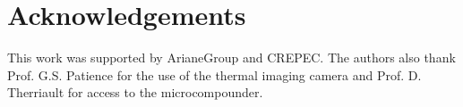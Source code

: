 \section{Acknowledgements}

This work was supported by ArianeGroup and CREPEC. 
The authors also thank Prof. G.S. Patience for the use of the thermal imaging camera and Prof. D. Therriault for access to the microcompounder. 
